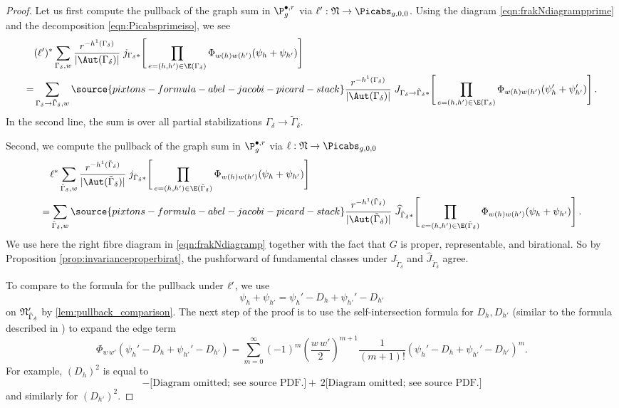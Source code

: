 \begin{proof}
Let us first compute the pullback of the graph sum in $\P_g^{\bullet,r}$ via $\sourcemap : \frak N \to \Picabs_{g,0,0}$. Using the diagram \eqref{eqn:frakNdiagrampprime} and the decomposition \eqref{eqn:Picabsprimeiso}, we see
\begin{align}
&(\sourcemap)^* \sum_{\Gamma_\delta, w}
\frac{r^{-h^1( \Gamma_\delta)}}{|\Aut(\Gamma_\delta)| }
\;
j_{\Gamma_\delta*}\Bigg[
\prod_{e=(h,h')\in \E(\Gamma_\delta)}
\Phi_{w(h)w(h')}(\psi_h + \psi_{h'}) \Bigg] \nonumber\\
=&\sum_{\Gamma_\delta \to \tilde \Gamma_\delta, w} \label{eqn:pprimepullb}
\source{pixtons-formula-abel-jacobi-picard-stack}
\frac{r^{-h^1( \Gamma_\delta)}}{|\Aut(\Gamma_\delta)| }
\;
J_{\Gamma_\delta \to \tilde \Gamma_\delta*}\Bigg[
\prod_{e=(h,h')\in \E(\Gamma_\delta)}
\Phi_{w(h)w(h')}(\psi'_h + \psi'_{h'}) \Bigg]\, .
\end{align}
In the second line, the sum is over all partial stabilizations $\Gamma_\delta \to \tilde \Gamma_\delta$.

Second, we compute the pullback of the graph sum in $\P_g^{\bullet,r}$ via $\targetmap : \frak N \to \Picabs_{g,0,0}$
\begin{align}
&\targetmap^* \sum_{\tilde \Gamma_\delta, w}
\frac{r^{-h^1(\tilde  \Gamma_\delta)}}{|\Aut(\tilde \Gamma_\delta)| }
\;
j_{\tilde \Gamma_\delta*}\Bigg[
\prod_{e=(h,h')\in \E(\tilde \Gamma_\delta)}
\Phi_{w(h)w(h')}(\psi_h + \psi_{h'}) \Bigg]\nonumber \\
=&\sum_{\tilde \Gamma_\delta, w}\label{eqn:ppullb}
\source{pixtons-formula-abel-jacobi-picard-stack}
\frac{r^{-h^1(\tilde \Gamma_\delta)}}{|\Aut(\tilde \Gamma_\delta)| }
\;
\widehat J_{\tilde \Gamma_\delta*}\Bigg[
\prod_{e=(h,h')\in \E(\tilde \Gamma_\delta)}
\Phi_{w(h)w(h')}(\psi_h + \psi_{h'}) \Bigg]\, .
\end{align}
We use here the right fibre diagram in \eqref{eqn:frakNdiagramp} together with the fact that $G$ is proper, representable, and birational.  So by Proposition \ref{prop:invarianceproperbirat},
the pushforward of fundamental classes under $J_{\tilde \Gamma_\delta}$ and $\widehat J_{\tilde \Gamma_\delta}$ agree.

To compare to the formula for the pullback under $\ell'$, we use
$$\psi_h + \psi_{h'} = \psi_h' - D_h + \psi_{h'}'- D_{h'}$$ on $\frak N'_{\tilde \Gamma_\delta}$ by \cref{lem:pullback_comparison}.
The next step of the proof is to use the self-intersection formula for $D_h, D_{h'}$ (similar to the formula described in \cite[Appendix A]{GraberPandharipande}) to expand the edge term
\[\Phi_{w\,w'}(\psi_h' - D_h + \psi_{h'}'- D_{h'}) = \sum_{m=0}^\infty (-1)^m (\frac{w\,w'}{2})^{m+1} \frac{1}{(m+1)!}(\psi_h' - D_h + \psi_{h'}'- D_{h'})^m.\] For example, $(D_h)^2$ is equal to
\begin{equation*}
-
    \text{[Diagram omitted; see source PDF.]}
+ \,2
    \text{[Diagram omitted; see source PDF.]}
\end{equation*}
and similarly for $(D_{h'})^2$.


\end{proof}
